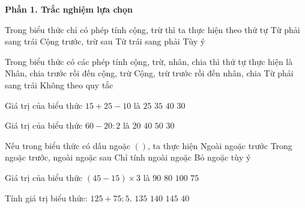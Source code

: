 \textbf{Phần 1. Trắc nghiệm lựa chọn}

\begin{ex} %
Trong biểu thức chỉ có phép tính cộng, trừ thì ta thực hiện theo thứ tự
\choice
{Từ phải sang trái}
{Cộng trước, trừ sau}
{\True Từ trái sang phải}
{Tùy ý}
\end{ex}

\begin{ex} %
Trong biểu thức có các phép tính cộng, trừ, nhân, chia thì thứ tự thực hiện là
\choice
{\True Nhân, chia trước rồi đến cộng, trừ}
{Cộng, trừ trước rồi đến nhân, chia}
{Từ phải sang trái}
{Không theo quy tắc}
\end{ex}

\begin{ex} %
Giá trị của biểu thức $15 + 25 - 10$ là
\choice
{$25$}
{$35$}
{$40$}
{\True $30$}
\end{ex}

\begin{ex} %
Giá trị của biểu thức $60 - 20 : 2$ là
\choice
{$20$}
{$40$}
{\True $50$}
{$30$}
\end{ex}

\begin{ex} %
Nếu trong biểu thức có dấu ngoặc $( )$, ta thực hiện
\choice
{Ngoài ngoặc trước}
{\True Trong ngoặc trước, ngoài ngoặc sau}
{Chỉ tính ngoài ngoặc}
{Bỏ ngoặc tùy ý}
\end{ex}

\begin{ex} %
Giá trị của biểu thức $(45 - 15) \times 3$ là
\choice
{\True $90$}
{$80$}
{$100$}
{$75$}
\end{ex}

\begin{ex} %
Tính giá trị biểu thức: $125 + 75 : 5$.
\choice
{$135$}
{\True $140$}
{$145$}
{$40$}
\end{ex}

